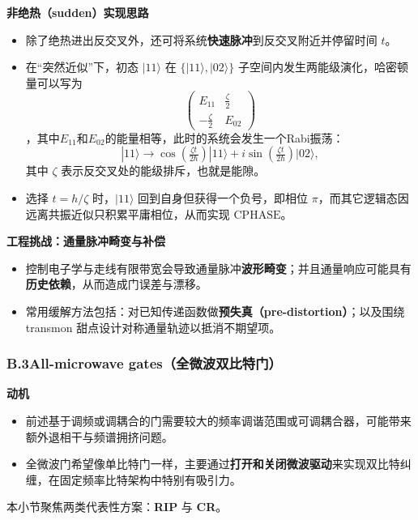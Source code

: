 \documentclass[12pt,a4paper,oneside]{ctexbook}
\begin{document}
\noindent\textbf{非绝热（sudden）实现思路}

\begin{itemize}
  \item 除了绝热进出反交叉外，还可将系统\textbf{快速脉冲}到反交叉附近并停留时间 $t$。
  \item 在“突然近似”下，初态 $|11\rangle$ 在 $\{|11\rangle,|02\rangle\}$ 子空间内发生两能级演化，哈密顿量可以写为$$\begin{pmatrix} E_{11} & \frac{\zeta}{2} \\ -\frac{\zeta}{2} & E_{02} \end{pmatrix}$$，其中$E_{11}$和$E_{02}$的能量相等，此时的系统会发生一个Rabi振荡：
  \[
    |11\rangle \rightarrow \cos(\tfrac{\zeta t}{2\hbar})|11\rangle + i\sin(\tfrac{\zeta t}{2\hbar})|02\rangle,
  \]
  其中 $\zeta$ 表示反交叉处的能级排斥，也就是能隙。
  \item 选择 $t=h/\zeta$ 时，$|11\rangle$ 回到自身但获得一个负号，即相位 $\pi$，而其它逻辑态因远离共振近似只积累平庸相位，从而实现 $\mathrm{CPHASE}$。
\end{itemize}

\noindent\textbf{工程挑战：通量脉冲畸变与补偿}

\begin{itemize}
  \item 控制电子学与走线有限带宽会导致通量脉冲\textbf{波形畸变}；并且通量响应可能具有\textbf{历史依赖}，从而造成门误差与漂移。
  \item 常用缓解方法包括：对已知传递函数做\textbf{预失真（pre-distortion）}；以及围绕 transmon 甜点设计对称通量轨迹以抵消不期望项。
\end{itemize}

\subsubsection{B.3\quad All-microwave gates（全微波双比特门）}

\noindent\textbf{动机}

\begin{itemize}
  \item 前述基于调频或调耦合的门需要较大的频率调谐范围或可调耦合器，可能带来额外退相干与频谱拥挤问题。
  \item 全微波门希望像单比特门一样，主要通过\textbf{打开和关闭微波驱动}来实现双比特纠缠，在固定频率比特架构中特别有吸引力。
\end{itemize}

本小节聚焦两类代表性方案：\textbf{RIP} 与 \textbf{CR}。
\end{document}
